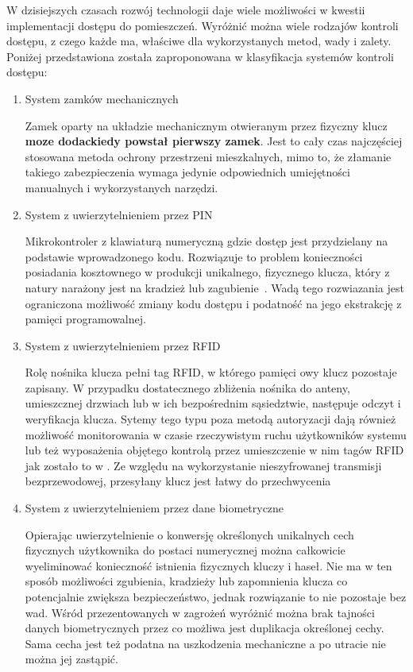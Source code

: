 		W dzisiejszych czasach rozwój technologii daje wiele możliwości w kwestii implementacji dostępu do pomieszczeń. Wyróżnić można wiele rodzajów kontroli dostępu, z czego każde ma, właściwe dla wykorzystanych metod, wady i zalety. Poniżej przedstawiona została zaproponowana w \cite{access-system-survey} klasyfikacja systemów kontroli dostępu:
		\begin{enumerate}[label=\Alph*.]
			\item System zamków mechanicznych

				Zamek oparty na układzie mechanicznym otwieranym przez fizyczny klucz \textbf{moze dodackiedy powstał pierwszy zamek}. Jest to cały czas najczęściej stosowana metoda ochrony przestrzeni mieszkalnych, mimo to, że złamanie takiego zabezpieczenia wymaga jedynie odpowiednich umiejętności manualnych i wykorzystanych narzędzi.

			\item System z uwierzytelnieniem przez PIN

				Mikrokontroler z klawiaturą numeryczną gdzie dostęp jest przydzielany na podstawie wprowadzonego kodu. Rozwiązuje to problem konieczności posiadania kosztownego w produkcji unikalnego, fizycznego klucza, który z natury narażony jest na kradzież lub zagubienie~\cite{keypad-access-system}. Wadą tego rozwiazania jest ograniczona możliwość zmiany kodu dostępu i podatność na jego ekstrakcję z pamięci programowalnej.

			\item System z uwierzytelnieniem przez RFID

				Rolę nośnika klucza pełni tag RFID, w którego pamięci owy klucz pozostaje zapisany. W przypadku dostatecznego zbliżenia nośnika do anteny, umieszcznej drzwiach lub w ich bezpośrednim sąsiedztwie, następuje odczyt i weryfikacja klucza. Sytemy tego typu poza metodą autoryzacji dają również możliwość monitorowania w czasie rzeczywistym ruchu użytkowników systemu lub też wyposażenia objętego kontrolą przez umieszczenie w nim tagów RFID jak zostało to  w \cite{rfid-access-system-for-university}. Ze względu na wykorzystanie nieszyfrowanej transmisji bezprzewodowej, przesyłany klucz jest łatwy do przechwycenia

			\item System z uwierzytelnieniem przez dane biometryczne

				Opierając uwierzytelnienie o konwersję określonych unikalnych cech fizycznych użytkownika do postaci numerycznej można całkowicie wyeliminować konieczność istnienia fizycznych kluczy i haseł. Nie ma w ten sposób możliwości zgubienia, kradzieży lub zapomnienia klucza co potencjalnie zwiększa bezpieczeństwo, jednak rozwiązanie to nie pozostaje bez wad. Wśród przezentowanych w \cite{biometric-system-vulnerabilities} zagrożeń wyróżnić można brak tajności danych biometrycznych przez co możliwa jest duplikacja określonej cechy. Sama cecha jest też podatna na uszkodzenia mechaniczne a po utracie nie można jej zastąpić.


\end{enumerate}
